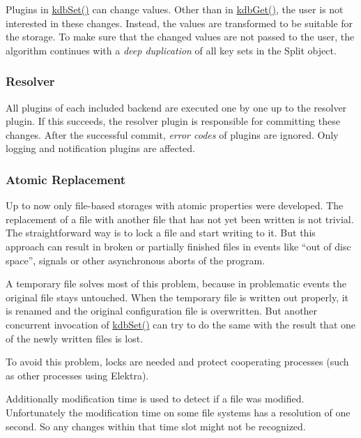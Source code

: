 Plugins in {\ttfamily \hyperlink{group__kdb_ga11436b058408f83d303ca5e996832bcf}{kdb\+Set()}} can change values. Other than in {\ttfamily \hyperlink{group__kdb_ga28e385fd9cb7ccfe0b2f1ed2f62453a1}{kdb\+Get()}}, the user is not interested in these changes. Instead, the values are transformed to be suitable for the storage. To make sure that the changed values are not passed to the user, the algorithm continues with a {\itshape deep duplication} of all key sets in the {\ttfamily Split} object.

\subsubsection*{Resolver}

All plugins of each included backend are executed one by one up to the resolver plugin. If this succeeds, the resolver plugin is responsible for committing these changes. After the successful commit, {\itshape error codes} of plugins are ignored. Only logging and notification plugins are affected.

\subsubsection*{Atomic Replacement}

Up to now only file-\/based storages with atomic properties were developed. The replacement of a file with another file that has not yet been written is not trivial. The straightforward way is to lock a file and start writing to it. But this approach can result in broken or partially finished files in events like “out of disc space”, signals or other asynchronous aborts of the program.

A temporary file solves most of this problem, because in problematic events the original file stays untouched. When the temporary file is written out properly, it is renamed and the original configuration file is overwritten. But another concurrent invocation of {\ttfamily \hyperlink{group__kdb_ga11436b058408f83d303ca5e996832bcf}{kdb\+Set()}} can try to do the same with the result that one of the newly written files is lost.

To avoid this problem, locks are needed and protect cooperating processes (such as other processes using Elektra).

Additionally modification time is used to detect if a file was modified. Unfortunately the modification time on some file systems has a resolution of one second. So any changes within that time slot might not be recognized.

